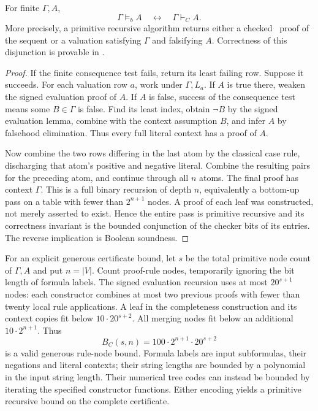 \begin{theorem}\label{thm:cpc-complete}
For finite $\Gamma,A$,
\[
 \Gamma\models_b A\quad\leftrightarrow\quad \Gamma\vdash_C A.
\]
More precisely, a primitive recursive algorithm returns either a checked
\CPC\ proof of the sequent or a valuation satisfying $\Gamma$ and falsifying
$A$. Correctness of this disjunction is provable in \ipra.
\end{theorem}
\begin{proof}
If the finite consequence test fails, return its least failing row. Suppose
it succeeds. For each valuation row $a$, work under $\Gamma,L_a$. If $A$
is true there, weaken the signed evaluation proof of $A$. If $A$ is false,
success of the consequence test means some $B\in\Gamma$ is false. Find its
least index, obtain $\neg B$ by the signed evaluation lemma, combine with
the context assumption $B$, and infer $A$ by falsehood elimination.
Thus every full literal context has a proof of $A$.

Now combine the two rows differing in the last atom by the classical case
rule, discharging that atom's positive and negative literal. Combine the
resulting pairs for the preceding atom, and continue through all $n$
atoms. The final proof has context $\Gamma$. This is a full binary recursion
of depth $n$, equivalently a bottom-up pass on a table with fewer than
$2^{n+1}$ nodes. A proof of each leaf was constructed, not merely asserted
to exist. Hence the entire pass is primitive recursive and its correctness
invariant is the bounded conjunction of the checker bits of its entries.
The reverse implication is Boolean soundness.
\end{proof}

For an explicit generous certificate bound, let $s$ be the total primitive
node count of $\Gamma,A$ and put $n=|V|$. Count proof-rule nodes, temporarily
ignoring the bit length of formula labels. The signed evaluation recursion
uses at most $20^{s+1}$ nodes: each constructor combines at most two previous
proofs with fewer than twenty local rule applications. A leaf in the
completeness construction and its context copies fit below
$10\cdot20^{s+2}$. All merging nodes fit below an additional
$10\cdot2^{n+1}$. Thus
\[
 B_C(s,n)=100\cdot2^{n+1}\cdot20^{s+2}
\]
is a valid generous rule-node bound. Formula labels are input subformulas,
their negations and literal contexts; their string lengths are bounded by
a polynomial in the input string length. Their numerical tree codes can
instead be bounded by iterating the specified constructor functions. Either
encoding yields a primitive recursive bound on the complete certificate.

